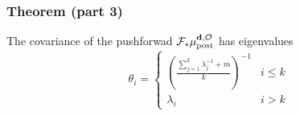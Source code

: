 \documentclass{beamer}
\begin{document}


\begin{frame}
  \frametitle{Theorem (part 3)}
  The covariance of the pushforwad \(\mathcal{F}_{*} \mu_{\textup{post}}^{\mathbf{d}, \mathcal{O}}\)
  has eigenvalues 
  \begin{equation*}
    \theta_i =
    \begin{cases}
      \left(\frac{\sum_{j=1}^k \lambda_j^{-1} + m}{k} \right )^{-1} & i \leq k \\
      \lambda_i &  i > k 
    \end{cases}
  \end{equation*}
\end{frame}
\end{document}
